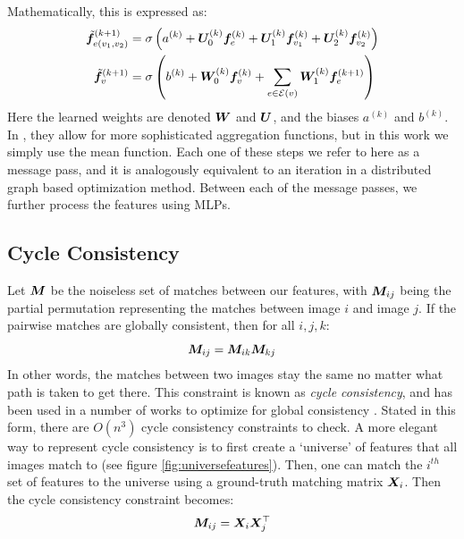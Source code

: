\documentclass{article} %
\begin{document}
Mathematically, this is expressed as: %
\begin{align}
\tilde{{\bm{f}}}_{e(v_1,v_2)}^{(k+1)} =&\; \sigma \left(a^{(k)} + {\bm{U}}_0^{(k)} {\bm{f}}_{e}^{(k)} + {\bm{U}}_1^{(k)} {\bm{f}}_{v_1}^{(k)} + {\bm{U}}_2^{(k)} {\bm{f}}_{v_2}^{(k)} \right) \\
\tilde{{\bm{f}}}_{v}^{(k+1)} =&\; \sigma\left(b^{(k)} + {\bm{W}}_0^{(k)} {\bm{f}}_{v}^{(k)} + \sum_{e \in \mathcal{E}(v)} {\bm{W}}_1^{(k)} {\bm{f}}_{e}^{(k+1)} \right) 
\end{align}
Here the learned weights are denoted ${\bm{W}}$ and ${\bm{U}}$, and the biases $a^{(k)}$ and  $b^{(k)}$.
In \cite{battaglia2018relational}, they allow for more sophisticated aggregation functions, but in this work we simply use the mean function.
Each one of these steps we refer to here as a message pass, and it is analogously equivalent to an iteration in a distributed graph based optimization method.
Between each of the message passes, we further process the features using MLPs.


\subsection{Cycle Consistency} \label{sec:cycconsist}

Let ${\bm{M}}$ be the noiseless set of matches between our features, with ${\bm{M}}_{ij}$ being the partial permutation representing the matches between image $i$ and image $j$.
If the pairwise matches are globally consistent, then for all $i, j, k$:
\begin{equation}
{\bm{M}}_{ij} = {\bm{M}}_{ik} {\bm{M}}_{kj}
\label{eq:cycconsist1}
\end{equation}
In other words, the matches between two images stay the same no matter what path is taken to get there. 
This constraint is known as \textit{cycle consistency}, and has been used in a number of works to optimize for global consistency \cite{zhou2015multi, wang2017multi, leonardos2016distributed}.
Stated in this form, there are $O(n^3)$ cycle consistency constraints to check.
A more elegant way to represent cycle consistency is to first create a `universe' of features that all images match to (see figure \ref{fig:universefeatures}).
Then, one can match the $i^{th}$ set of features to the universe using a ground-truth matching matrix ${\bm{X}}_i$.
Then the cycle consistency constraint becomes:
\begin{equation}
{\bm{M}}_{ij} = {\bm{X}}_{i}{\bm{X}}_{j}^\top
\label{eq:cycconsist2}
\end{equation}
\end{document}
